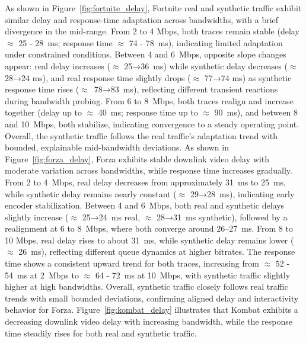 As shown in Figure~\ref{fig:fortnite_delay}, Fortnite real and synthetic traffic exhibit similar delay and response-time adaptation across bandwidths, with a brief divergence in the mid-range. From 2 to 4 Mbps, both traces remain stable (delay $\approx$ 25 - 28~ms; response time $\approx$ 74 - 78~ms), indicating limited adaptation under constrained conditions. Between 4 and 6~Mbps, opposite slope changes appear: real delay increases ($\approx$ 25→36~ms) while synthetic delay decreases ($\approx$ 28→24 ms), and real response time slightly drops ($\approx$ 77→74 ms) as synthetic response time rises ($\approx$~78→83~ms), reflecting different transient reactions during bandwidth probing. From 6 to 8~Mbps, both traces realign and increase together (delay up to $\approx$ 40~ms; response time up to $\approx$ 90~ms), and between 8 and 10~Mbps, both stabilize, indicating convergence to a steady operating point. Overall, the synthetic traffic follows the real traffic’s adaptation trend with bounded, explainable mid-bandwidth deviations.
As shown in Figure~\ref{fig:forza_delay}, Forza exhibits stable downlink video delay with moderate variation across bandwidths, while response time increases gradually. From 2 to 4~Mbps, real delay decreases from approximately 31~ms to 25~ms, while synthetic delay remains nearly constant ($\approx$ 29→28~ms), indicating early encoder stabilization. Between 4 and 6~Mbps, both real and synthetic delays slightly increase ($\approx$ 25→24~ms real, $\approx$ 28→31~ms synthetic), followed by a realignment at 6 to 8~Mbps, where both converge around 26–27~ms. From 8 to 10 Mbps, real delay rises to about 31~ms, while synthetic delay remains lower ($\approx$ 26~ms), reflecting different queue dynamics at higher bitrates. The response time shows a consistent upward trend for both traces, increasing from $\approx$ 52 - 54~ms at 2~Mbps to $\approx$ 64 - 72~ms at 10~Mbps, with synthetic traffic slightly higher at high bandwidths. Overall, synthetic traffic closely follows real traffic trends with small bounded deviations, confirming aligned delay and interactivity behavior for Forza.
Figure~\ref{fig:kombat_delay} illustrates that Kombat exhibits a decreasing downlink video delay with increasing bandwidth, while the response time steadily rises for both real and synthetic traffic.
